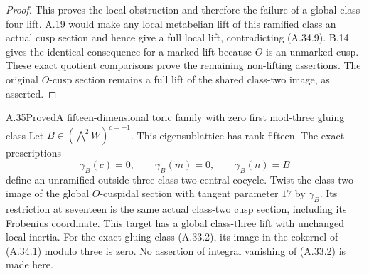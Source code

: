 \begin{proof}
This proves the local obstruction and therefore the
failure of a global class-four lift. A.19 would make
any local metabelian lift of this ramified class an
actual cusp section and hence give a full local lift,
contradicting (A.34.9). B.14 gives the identical
consequence for a marked lift because $O$ is an
unmarked cusp. These exact quotient comparisons prove
the remaining non-lifting assertions. The original
$O$-cusp section remains a full lift of the shared
class-two image, as asserted.
\end{proof}

\begin{statement}{A.35}{Proved}{A fifteen-dimensional toric family with zero first mod-three gluing class}
Let $B\in(\bigwedge^2W)^{c=-1}$. This eigensublattice has
rank fifteen. The exact prescriptions
\[
 \gamma_B(c)=0,\qquad \gamma_B(m)=0,
                  \qquad\gamma_B(n)=B
 \tag{A.35.1}
\]
define an unramified-outside-three class-two central cocycle.
Twist the class-two image of the global $O$-cuspidal section
with tangent parameter $17$ by $\gamma_B$.
Its restriction at seventeen is the same actual class-two
cusp section, including its Frobenius coordinate. This target
has a global class-three lift with unchanged local inertia.
For the exact gluing class (A.33.2), its image in the
cokernel of (A.34.1) modulo three is zero.
No assertion of integral vanishing of (A.33.2) is made here.
\end{statement}

